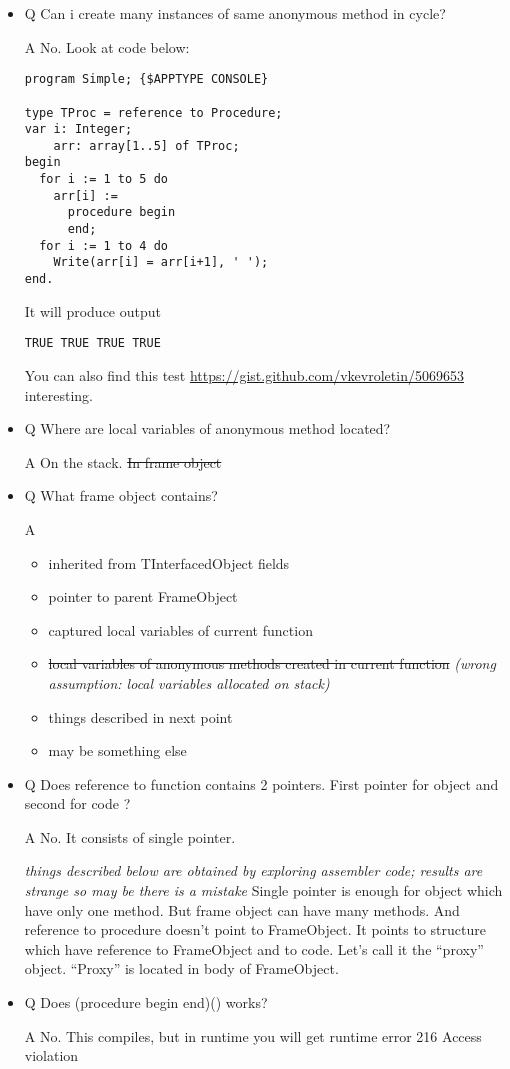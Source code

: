 \documentclass[11pt]{article}
\begin{document}
\begin{itemize}
\item Q Can i create many instances of same anonymous method in cycle?
  
  A No. Look at code below:

\begin{verbatim}
program Simple; {$APPTYPE CONSOLE}

type TProc = reference to Procedure;
var i: Integer;
    arr: array[1..5] of TProc;
begin
  for i := 1 to 5 do
    arr[i] :=
      procedure begin
      end;
  for i := 1 to 4 do
    Write(arr[i] = arr[i+1], ' ');
end.
\end{verbatim}
  It will produce output

\begin{verbatim}
TRUE TRUE TRUE TRUE
\end{verbatim}

  You can also find this test
  \href{https://gist.github.com/vkevroletin/5069653}{https://gist.github.com/vkevroletin/5069653} interesting.
\item Q Where are local variables of anonymous method located?

  A On the stack. \st{In frame object}
\item Q What frame object contains?

  A
\begin{itemize}
\item inherited from TInterfacedObject fields
\item pointer to parent FrameObject
\item captured local variables of current function
\item \st{local variables of anonymous methods created in current       function} \emph{(wrong assumption: local variables allocated on stack)}
\item things described in next point
\item may be something else
\end{itemize}
\item Q Does reference to function contains 2 pointers. First pointer
  for object and second for code ?
 
  A No. It consists of single pointer.

  \emph{things described below are obtained by exploring    assembler code; results are strange so may be there is a mistake}
  Single pointer is enough for object which have only one method. But
  frame object can have many methods. And reference to procedure
  doesn't point to FrameObject. It points to structure which have
  reference to FrameObject and to code. Let's call it the ``proxy''
  object. ``Proxy'' is located in body of FrameObject.
\item Q Does (procedure begin end)() works?

  A No. This compiles, but in runtime you will get
   runtime error 216
   Access violation
\end{itemize}
\end{document}
